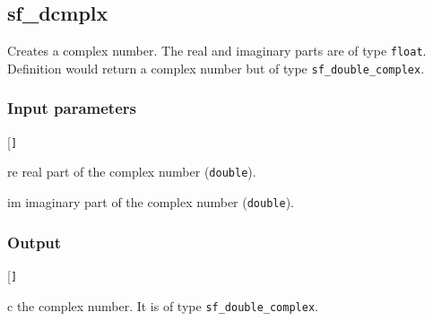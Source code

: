 \subsection{{sf\_dcmplx}}
Creates a complex number. The real and imaginary parts are of type \texttt{float}. Definition would return a complex number but of type \texttt{sf\_double\_complex}.

\subsubsection*{Input parameters}
\begin{desclist}{\tt }{\quad}[\tt ]
   \setlength\itemsep{0pt}
   \item[re] real part of the complex number (\texttt{double}).
   \item[im] imaginary part of the complex number (\texttt{double}).
\end{desclist}

\subsubsection*{Output}
\begin{desclist}{\tt }{\quad}[\tt ]
   \setlength\itemsep{0pt}
   \item[c] the complex number. It is of type \texttt{sf\_double\_complex}.
\end{desclist}

